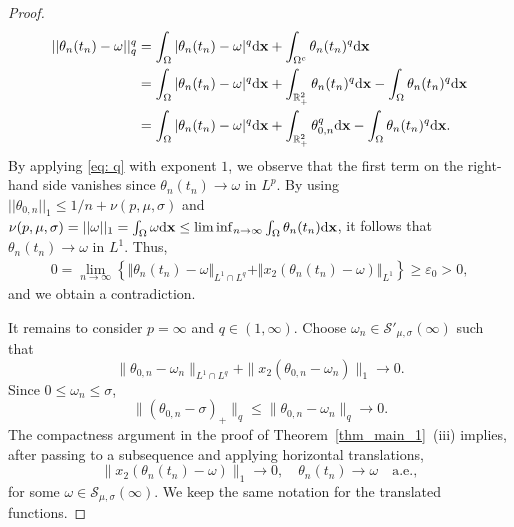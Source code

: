 \documentclass[11pt]{amsart}
\theoremstyle{definition}
\theoremstyle{definition}
\numberwithin{equation}{section}
\newcommand{\nrm}[1]{\Vert#1\Vert}
\newcommand{\0}{\emptyset}
\newcommand{\tht}{\theta}
\newcommand{\omg}{\omega}
\newcommand{\bfx}{{\bf x}}
\newcommand{\calS}{\mathcal S}
\newcommand{\dd}{\mathrm{d}}
\begin{document}
\begin{proof}
\begin{equation}
					\begin{aligned}
						||\theta_n(t_n)-\omega||_{q}^{q}
						&=\int_{\Omega}| \theta_n(t_n)-\omega|^{q} \dd \bfx +\int_{\Omega^{c}} \theta_n(t_n)^{q} \dd \bfx\\
						&=\int_{\Omega}| \theta_n(t_n)-\omega|^{q} \dd \bfx +\int_{\mathbb{R}^{2}_{+}} \theta_n(t_n)^{q} \dd \bfx -\int_{\Omega} \theta_n(t_n)^{q} \dd \bfx \\
						&=\int_{\Omega}| \theta_n(t_n)-\omega|^{q} \dd \bfx +\int_{\mathbb{R}^{2}_{+}} \theta_{0,n}^{q} \dd \bfx - \int_{\Omega} \theta_n(t_n)^{q} \dd \bfx.
					\end{aligned}
					\label{eq: q}
				\end{equation}
				By applying \eqref{eq: q} with exponent $1$, we observe that the first term on the right-hand side vanishes since $\theta_{n}(t_n)\to \omega$ in $L^{p}$.
				By using $||\theta_{0,n}||_1\leq 1/n+\nu(p, \mu, \sigma)$ and $\nu(p, \mu, \sigma)=||\omega||_1=\int_{\Omega}\omega \dd \bfx \leq \liminf_{n\to\infty}\int_{\Omega}\theta_n(t_n) \dd \bfx$, it follows that $\theta_n(t_n)\to \omega$ in $L^{1}$.
				Thus, 
				\begin{align*}
					0= \lim_{n\to\infty}\left\{\nrm{\tht_n(t_n)-\omg}_{L^{1}\cap L^{q}} + \nrm{x_2(\tht_n(t_n)-\omg )}_{L^{1}}\right\}\geq \varepsilon_0>0,
				\end{align*}
				and we obtain a contradiction.
                
                {
                It remains to consider $p = \infty$ and $q \in (1, \infty)$.
                Choose $\omega_n \in \calS'_{\mu,\sigma}(\infty)$ such that
                \[
                \|\theta_{0,n} - \omega_n\|_{L^1 \cap L^q} + \|x_2( \theta_{0,n} - \omega_n)\|_1 \to 0.
                \]
                Since $0 \le \omega_n \le \sigma$,
                \[
                \|(\theta_{0,n}-\sigma)_+\|_q \le \|\theta_{0,n} - \omega_n\|_q \to 0.
                \]
                The compactness argument in the proof of Theorem~\ref{thm_main_1}~(iii) implies, after passing to a subsequence and applying horizontal translations,
                \[
                \|x_2(\theta_n(t_n) - \omega)\|_1 \to 0, \quad \theta_n(t_n) \to \omega \quad\textrm{a.e.},
                \]
                for some $\omega\in\calS_{\mu,\sigma}(\infty)$.
                We keep the same notation for the translated functions.

}
\end{proof}
\end{document}
